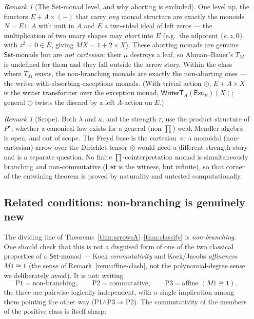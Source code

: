 \documentclass[11pt]{amsart}
\theoremstyle{plain}
\theoremstyle{definition}
\theoremstyle{remark}
\newtheorem{remark}[theorem]{Remark}
\newcommand{\Set}{\mathsf{Set}}
\newcommand{\List}{\mathsf{List}}
\begin{document}
\begin{remark}[The Set-monad level, and why aborting is excluded]
One level up, the functors $E+A\times(-)$ that carry \emph{any} monad structure are exactly
the monoids $N=E\sqcup A$ with unit in $A$ and $E$ a two-sided ideal of left zeros --- the
multiplication of two unary shapes may \emph{abort} into $E$ (e.g.\ the nilpotent
$\{e,z,0\}$ with $z^2=0\in E$, giving $MX=1+2\times X$). These aborting monads are genuine
$\Set$-monads but are \emph{not cartesian}: their $\mu$ destroys a leaf, so Ahman--Bauer's
$T_M$ is undefined for them and they fall outside the arrow story. Within the class where
$T_M$ exists, the non-branching monads are exactly the non-aborting ones --- the
writer-with-absorbing-exceptions monads. (With trivial action $\odot$, $E+A\times X$ is the
writer transformer over the exception monad, $\mathsf{WriterT}_A(\mathsf{Exc}_E)(X)$; general
$\odot$ twists the discard by a left $A$-action on $E$.)
\end{remark}

\begin{remark}[Scope]\label{rem:scope}
Both $\lambda$ and $\kappa$, and the strength $\tau$, use the product structure of $P^\star$;
whether a canonical law exists for a general (non-$\prod$) weak Mendler algebra is open, and
out of scope. The Freyd base is the cartesian $\times$; a monoidal (non-cartesian) arrow over
the Dirichlet tensor $\otimes$ would need a different strength story and is a separate
question. No finite $\prod$-cointerpretation monad is simultaneously branching and
non-commutative ($\List$ is the witness, but infinite), so that corner of the entwining
theorem is proved by naturality and untested computationally.
\end{remark}

\subsection{Related conditions: non-branching is genuinely new}\label{sec:related-conditions}
The dividing line of Theorems~\ref{thm:arrowsA}--\ref{thm:classify} is \emph{non-branching}.
One should check that this is not a disguised form of one of the two classical properties of a
$\Set$-monad --- Kock \emph{commutativity} \cite{Kock70,Kock71} and Kock/Jacobs
\emph{affineness} $M1\cong1$ \cite{Jacobs16} (the sense of Remark~\ref{rem:affine-clash}, not
the polynomial-degree sense we deliberately avoid). It is not: writing
\[
  \text{P1}=\text{non-branching},\qquad \text{P2}=\text{commutative},\qquad
  \text{P3}=\text{affine }(M1\cong1),
\]
the three are pairwise logically independent, with a single implication among them pointing the
other way (P1$\wedge$P3$\Rightarrow$P2). The commutativity of the members of the positive class
is itself sharp:
\end{document}
